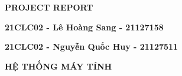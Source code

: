 \documentclass[12pt,a4paper]{article}
\begin{document}
\thispagestyle{empty}
\begin{LARGE}
    \begin{center}{\underline{\color{red}{\bf NATIONAL UNIVERSITY OF HO CHI MINH CITY}}}
    \end{center}
\end{LARGE}
\vspace*{1cm}
\begin{center}{\Huge \color{blue}\textbf{PROJECT REPORT}}
\end{center}
\vspace*{15cm}
\begin{center}{\Huge \color{blue}\textbf{21CLC02 - Lê Hoàng Sang - 21127158}}
\end{center}
\begin{center}{\Huge \color{blue}\textbf{21CLC02 - Nguyễn Quốc Huy - 21127511}}
\end{center}
\vspace*{1cm}
\begin{center}
    {\Huge \color{blue}\textbf{{HỆ THỐNG MÁY TÍNH}}}
\end{center}
\newpage
\let\cleardoublepage\clearpage
\end{document}
